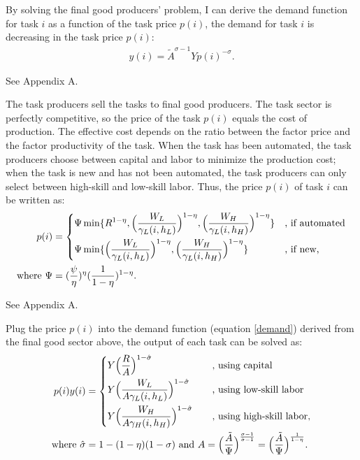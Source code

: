 \documentclass[12pt]{article}
\begin{document}
By solving the final good producers' problem, I can derive the demand function for task $i$ as a function of the task price $p(i)$, the demand for task $i$ is decreasing in the task price $p(i)$:
\begin{align}
\label{demand}
y(i) = \tilde{A}^{\sigma-1}Yp(i)^{-\sigma}.
\end{align}

 See Appendix A.

The task producers sell the tasks to final good producers. The task sector is perfectly competitive, so the price of the task $p(i)$ equals the cost of production. The effective cost depends on the ratio between the factor price and the factor productivity of the task. When the task has been automated, the task producers choose between capital and labor to minimize the production cost; when the task is new and has not been automated, the task producers can only select between high-skill and low-skill labor. Thus, the price $p(i)$ of task $i$ can be written as: 
\begin{align*}
p(i) &= 
\begin{dcases}
\Psi \min\{R^{1-\eta},\Big(\frac{W_L}{\gamma_L(i,h_L)}\Big)^{1-\eta},\Big(\frac{W_H}{\gamma_L(i,h_H)}\Big)^{1-\eta}\} &\text{, if automated}  \\
\Psi \min\{\Big(\frac{W_L}{\gamma_L(i,h_L)}\Big)^{1-\eta},\Big(\frac{W_H}{\gamma_L(i,h_H)}\Big)^{1-\eta}\} &\text{, if new,} 
\end{dcases} \\
\text{where } \Psi &= (\frac{\psi}{\eta})^{\eta}(\frac{1}{1-\eta})^{1-\eta}.
\end{align*}

 
 See Appendix A.

Plug the price $p(i)$ into the demand function (equation \ref{demand}) derived from the final good sector above, the output of each task can be solved as: 
\begin{align*}
p(i)y(i) &= 
\begin{dcases}
Y\Big(\frac{R}{A}\Big)^{1-\hat{\sigma}} &\quad  \text{, using capital}  \\
Y\Big(\frac{W_L}{A\gamma_L(i,h_L)}\Big)^{1-\hat{\sigma}} &\quad  \text{, using low-skill labor}    \\
Y\Big(\frac{W_H}{A\gamma_H(i,h_H)}\Big)^{1-\hat{\sigma}} &\quad  \text{, using high-skill labor}, 
\end{dcases} \\
\text{where } \hat{\sigma} &= 1-(1-\eta)(1-\sigma)\text{ and } A = \Big(\frac{\tilde{A}}{\Psi}\Big)^{\frac{\sigma-1}{\hat{\sigma}-1}}  = \Big(\frac{\tilde{A}}{\Psi}\Big)^{\frac{1}{1-\eta}}.
\end{align*}
\end{document}
